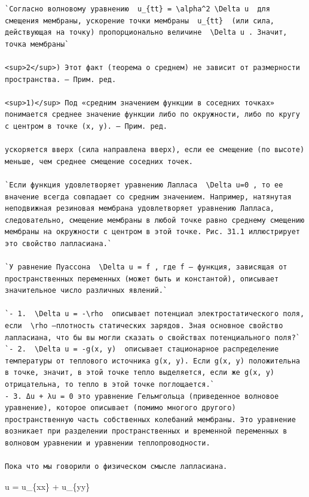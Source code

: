 \documentclass[
  ukrainian,
]{article}
\begin{document}
\begin{verbatim}
`Согласно волновому уравнению  u_{tt} = \alpha^2 \Delta u  для смещения мембраны, ускорение точки мембраны  u_{tt}  (или сила, действующая на точку) пропорционально величине  \Delta u . Значит, точка мембраны`

<sup>2</sup>) Этот факт (теорема о среднем) не зависит от размерности пространства. — Прим. ред.

<sup>1)</sup> Под «средним значением функции в соседних точках» понимается среднее значение функции либо по окружности, либо по кругу с центром в точке (x, y). — Прим. ред.

ускоряется вверх (сила направлена вверх), если ее смещение (по высоте) меньше, чем среднее смещение соседних точек.

`Если функция удовлетворяет уравнению Лапласа  \Delta u=0 , то ее вначение всегда совпадает со средним значением. Например, натянутая неподвижная резиновая мембрана удовлетворяет уравнению Лапласа, следовательно, смещение мембраны в любой точке равно среднему смещению мембраны на окружности с центром в этой точке. Рис. 31.1 иллюстрирует это свойство лапласиана.`

`У равнение Пуассона  \Delta u = f , где f — функция, зависящая от пространственных переменных (может быть и константой), описывает значительное число различных явлений.`

`- 1.  \Delta u = -\rho  описывает потенциал электростатического поля, если  \rho —плотность статических зарядов. Зная основное свойство лапласиана, что бы вы могли сказать о свойствах потенциального поля?`
`- 2.  \Delta u = -g(x, y)  описывает стационарное распределение температуры от теплового источника g(x, y). Если g(x, y) положительна в точке, значит, в этой точке тепло выделяется, если же g(x, y) отрицательна, то тепло в этой точке поглощается.`
- 3. Δu + λu = 0 это уравнение Гельмгольца (приведенное волновое уравнение), которое описывает (помимо многого другого) пространственную часть собственных колебаний мембраны. Это уравнение возникает при разделении пространственных и временной переменных в волновом уравнении и уравнении теплопроводности.

Пока что мы говорили о физическом смысле лапласиана.
\end{verbatim}

\Delta u = u\_\{xx\} + u\_\{yy\}
\end{document}
